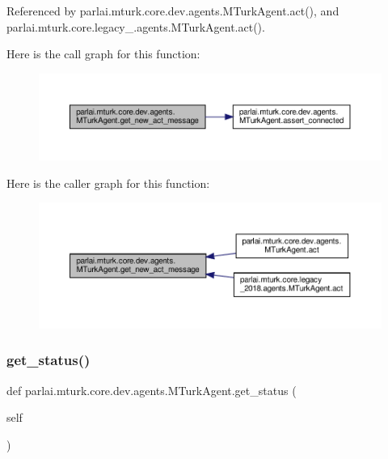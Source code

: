 Referenced by parlai.\+mturk.\+core.\+dev.\+agents.\+M\+Turk\+Agent.\+act(), and parlai.\+mturk.\+core.\+legacy\+\_.\+agents.\+M\+Turk\+Agent.\+act().

Here is the call graph for this function\+:
\nopagebreak
\begin{figure}[H]
\begin{center}
\leavevmode
\includegraphics[width=350pt]{classparlai_1_1mturk_1_1core_1_1dev_1_1agents_1_1MTurkAgent_aab8cc8a2bb337300bd39709702e68cff_cgraph}
\end{center}
\end{figure}
Here is the caller graph for this function\+:
\nopagebreak
\begin{figure}[H]
\begin{center}
\leavevmode
\includegraphics[width=350pt]{classparlai_1_1mturk_1_1core_1_1dev_1_1agents_1_1MTurkAgent_aab8cc8a2bb337300bd39709702e68cff_icgraph}
\end{center}
\end{figure}
\mbox{\label{classparlai_1_1mturk_1_1core_1_1dev_1_1agents_1_1MTurkAgent_a2423bb27d86be375313b61a60a12be0d}} 
\subsubsection{\texorpdfstring{get\+\_\+status()}{get\_status()}}
{\footnotesize\ttfamily def parlai.\+mturk.\+core.\+dev.\+agents.\+M\+Turk\+Agent.\+get\+\_\+status (\begin{DoxyParamCaption}\item[{}]{self }\end{DoxyParamCaption})}

